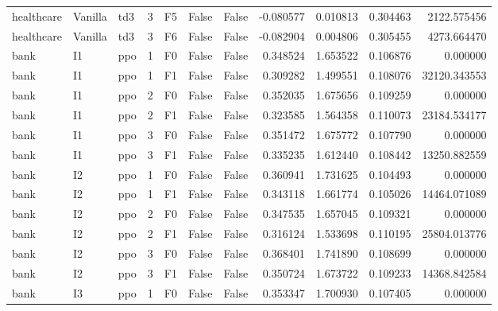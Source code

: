\begin{tabular}{lllrlllrrrr}
healthcare & Vanilla &       td3 &     3 &  F5 &           False &            False & -0.080577 &  0.010813 & 0.304463 &      2122.575456 \\
healthcare & Vanilla &       td3 &     3 &  F6 &           False &            False & -0.082904 &  0.004806 & 0.305455 &      4273.664470 \\
      bank &      I1 &       ppo &     1 &  F0 &           False &            False &  0.348524 &  1.653522 & 0.106876 &         0.000000 \\
      bank &      I1 &       ppo &     1 &  F1 &           False &            False &  0.309282 &  1.499551 & 0.108076 &     32120.343553 \\
      bank &      I1 &       ppo &     2 &  F0 &           False &            False &  0.352035 &  1.675656 & 0.109259 &         0.000000 \\
      bank &      I1 &       ppo &     2 &  F1 &           False &            False &  0.323585 &  1.564358 & 0.110073 &     23184.534177 \\
      bank &      I1 &       ppo &     3 &  F0 &           False &            False &  0.351472 &  1.675772 & 0.107790 &         0.000000 \\
      bank &      I1 &       ppo &     3 &  F1 &           False &            False &  0.335235 &  1.612440 & 0.108442 &     13250.882559 \\
      bank &      I2 &       ppo &     1 &  F0 &           False &            False &  0.360941 &  1.731625 & 0.104493 &         0.000000 \\
      bank &      I2 &       ppo &     1 &  F1 &           False &            False &  0.343118 &  1.661774 & 0.105026 &     14464.071089 \\
      bank &      I2 &       ppo &     2 &  F0 &           False &            False &  0.347535 &  1.657045 & 0.109321 &         0.000000 \\
      bank &      I2 &       ppo &     2 &  F1 &           False &            False &  0.316124 &  1.533698 & 0.110195 &     25804.013776 \\
      bank &      I2 &       ppo &     3 &  F0 &           False &            False &  0.368401 &  1.741890 & 0.108699 &         0.000000 \\
      bank &      I2 &       ppo &     3 &  F1 &           False &            False &  0.350724 &  1.673722 & 0.109233 &     14368.842584 \\
      bank &      I3 &       ppo &     1 &  F0 &           False &            False &  0.353347 &  1.700930 & 0.107405 &         0.000000 \\

\end{tabular}
